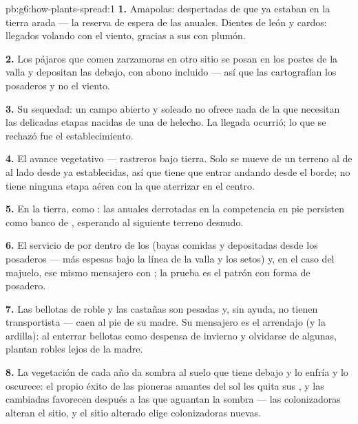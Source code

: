 \begin{solution}{pb:g6:how-plants-spread:1}
\textbf{1.} Amapolas: despertadas de  que ya estaban en la
tierra arada --- la reserva de espera de las anuales. Dientes de león y
cardos: llegados volando con el viento, gracias a sus  con
plumón.

\textbf{2.} Los pájaros que comen zarzamoras en otro sitio se posan en
los postes de la valla y depositan las  debajo, con abono
incluido --- así que las  cartografían los posaderos y no el
viento.

\textbf{3.} Su sequedad: un campo abierto y soleado no ofrece nada de
la  que necesitan las delicadas etapas nacidas de una  de
helecho. La llegada ocurrió; lo que se rechazó fue el establecimiento.

\textbf{4.} El avance vegetativo ---  rastreros bajo tierra. Solo
se mueve de un terreno al de al lado desde  ya establecidas, así
que tiene que entrar andando desde el borde; no tiene ninguna etapa
aérea con la que aterrizar en el centro.

\textbf{5.} En la tierra, como : las anuales derrotadas en la
competencia en pie persisten como banco de , esperando al
siguiente terreno desnudo.

\textbf{6.} El servicio de por dentro de los  (bayas comidas y
 depositadas desde los posaderos --- más espesas bajo la línea
de la valla y los setos) y, en el caso del majuelo, ese mismo mensajero
con ; la prueba es el patrón con forma de posadero.

\textbf{7.} Las bellotas de roble y las castañas son pesadas y, sin
ayuda, no tienen transportista --- caen al pie de su madre. Su
mensajero es el arrendajo (y la ardilla): al enterrar bellotas como
despensa de invierno y olvidarse de algunas, plantan robles lejos de la
madre.

\textbf{8.} La vegetación de cada año da sombra al suelo que tiene
debajo y lo enfría y lo oscurece: el propio éxito de las pioneras
amantes del sol les quita sus , y las  cambiadas
favorecen después a las que aguantan la sombra --- las colonizadoras
alteran el sitio, y el sitio alterado elige colonizadoras nuevas.


\end{solution}
